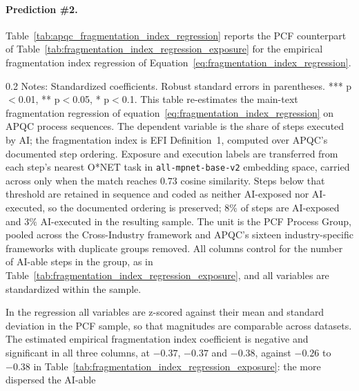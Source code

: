 \paragraph{Prediction \#2.}
Table~\ref{tab:apqc_fragmentation_index_regression} reports the PCF counterpart of Table~\ref{tab:fragmentation_index_regression_exposure} for the empirical fragmentation index regression of Equation~\eqref{eq:fragmentation_index_regression}.
\begin{table}[!t]
    \caption{Fragmentation and AI Execution on APQC's Documented Process Sequences}
    \label{tab:apqc_fragmentation_index_regression}
    \footnotesize
    \centering
    \begin{minipage}{1\linewidth}
\begin{spacing}{0.2}
{\fontsize{9.5pt}{10pt}\selectfont Notes: Standardized coefficients. Robust standard errors in parentheses. *** p$<$0.01, ** p$<$0.05, * p$<$0.1.
This table re-estimates the main-text fragmentation regression of equation~\eqref{eq:fragmentation_index_regression} on APQC process sequences.
The dependent variable is the share of steps executed by AI; the fragmentation index is EFI Definition~1, computed over APQC's documented step ordering.
Exposure and execution labels are transferred from each step's nearest O*NET task in \texttt{all-mpnet-base-v2} embedding space, carried across only when the match reaches $0.73$ cosine similarity.
Steps below that threshold are retained in sequence and coded as neither AI-exposed nor AI-executed, so the documented ordering is preserved; $8\%$ of steps are AI-exposed and $3\%$ AI-executed in the resulting sample.
The unit is the PCF Process Group, pooled across the Cross-Industry framework and APQC's sixteen industry-specific frameworks with duplicate groups removed.
All columns control for the number of AI-able steps in the group, as in Table~\ref{tab:fragmentation_index_regression_exposure}, and all variables are standardized within the sample.}
\end{spacing}
\end{minipage}\end{table}
In the regression all variables are z-scored against their mean and standard deviation in the PCF sample, so that magnitudes are comparable across datasets.
The estimated empirical fragmentation index coefficient is negative and significant in all three columns, at $-0.37$, $-0.37$ and $-0.38$, against $-0.26$ to $-0.38$ in Table~\ref{tab:fragmentation_index_regression_exposure}: the more dispersed the AI-able
